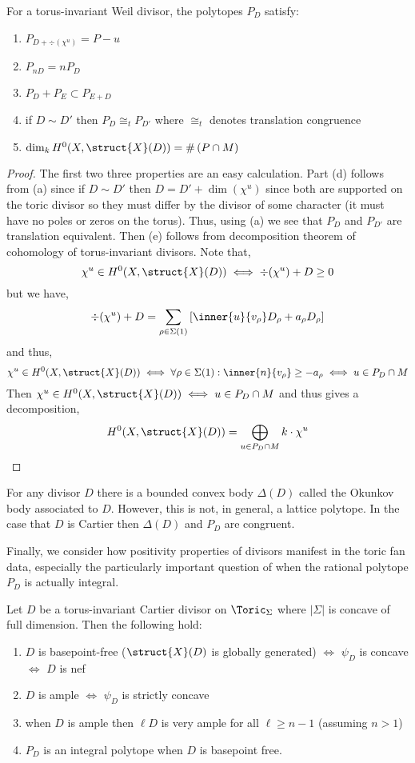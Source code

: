 \begin{proposition}
For a torus-invariant Weil divisor, the polytopes $P_D$ satisfy:
\begin{enumerate}
\item $P_{D + \div{(\chi^u)}} = P - u$
\item $P_{n D} = n P_D$
\item $P_{D} + P_{E} \subset P_{E + D}$
\item if $D \sim D'$ then $P_D \cong_t P_{D'}$ where $\cong_t$ denotes translation congruence
\item $\dim_k H^0(X, \struct{X}(D)) = \# \left( P \cap M \right)$
\end{enumerate}
\end{proposition}

\begin{proof}
The first two three properties are an easy calculation. Part (d) follows from (a) since if $D \sim D'$ then $D = D' + \dim{(\chi^u)}$ since both are supported on the toric divisor so they must differ by the divisor of some character (it must have no poles or zeros on the torus). Thus, using (a) we see that $P_D$ and $P_{D'}$ are translation equivalent. Then (e) follows from decomposition theorem of cohomology of torus-invariant divisors. Note that,
\[ \chi^u \in H^0(X, \struct{X}(D)) \iff \div{(\chi^u)} + D \ge 0 \]
but we have,
\[ \div{(\chi^u)} + D = \sum_{\rho \in \Sigma(1)} \left[ \inner{u}{v_\rho} D_\rho + a_\rho D_\rho \right] \]
and thus,
\[ \chi^u \in H^0(X, \struct{X}(D)) \iff \forall \rho \in \Sigma(1) : \inner{n}{v_\rho} \ge -a_\rho \iff u \in P_D \cap M \] 
Then $\chi^u \in H^0(X, \struct{X}(D)) \iff u \in P_D \cap M$ and thus gives a decomposition,
\[ H^0(X, \struct{X}(D)) = \bigoplus_{u \in P_D \cap M} k \cdot \chi^u \]
\end{proof} 

\begin{rmk}
For any divisor $D$ there is a bounded convex body $\Delta(D)$ called the Okunkov body associated to $D$. However, this is not, in general, a lattice polytope. In the case that $D$ is Cartier then $\Delta(D)$ and $P_D$ are congruent. 
\end{rmk}
\noindent
Finally, we consider how positivity properties of divisors manifest in the toric fan data, especially the particularly important question of when the rational polytope $P_D$ is actually integral. 

\begin{theorem} \label{divisor_positivity}
Let $D$ be a torus-invariant Cartier divisor on $\Toric_\Sigma$ where $|\Sigma|$ is concave of full dimension. Then the following hold:
\begin{enumerate}
\item $D$ is basepoint-free ($\struct{X}(D)$ is globally generated) $\iff$ $\psi_D$ is concave $\iff$ $D$ is nef
\item $D$ is ample $\iff$ $\psi_D$ is strictly concave 
\item when $D$ is ample then $\ell D$ is very ample for all $\ell \ge n - 1$ (assuming $n > 1$)
\item $P_D$ is an integral polytope when $D$ is basepoint free. 
\end{enumerate}
\end{theorem}

